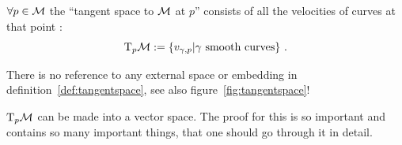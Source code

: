 \documentclass[11pt, a4paper, twocolumn]{article} %
\begin{document}
\begin{defn}
    $\forall p \in \mathcal{M}$ the ``tangent space to $\mathcal{M}$ at $p$'' consists of all the velocities
    of curves at that point :
    \begin{equation}
        \T_p\M:=\left\{ v_{\gamma,p} | \gamma\text{ smooth curves} \right\}\,.
    \end{equation}
    \label{def:tangentspace}
\end{defn}
\begin{note}
    There is no reference to any external space or embedding in definition~\ref{def:tangentspace},
    see also figure~\ref{fig:tangentspace}!
\end{note}
$\T_p\M$ can be made into a vector space. The proof for this is so important and contains so many
important things, that one should go through it in detail.
\end{document}
